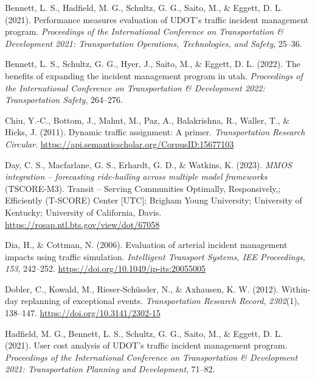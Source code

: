 \documentclass[fancy, oneside, mastersfancy, ms]{byuthesis}
\newlength{\cslhangindent}
\newlength{\cslentryspacingunit} %
\newenvironment{CSLReferences}[2] %
 {%
  \setlength{\parindent}{0pt}
  \ifodd #1
  \let\oldpar\par
  \def\par{\hangindent=\cslhangindent\oldpar}
  \fi
  \setlength{\parskip}{#2\cslentryspacingunit}
 }%
 {}
\begin{document}
\hypertarget{refs}{}
\begin{CSLReferences}{1}{0}
\leavevmode{}%
Bennett, L. S., Hadfield, M. G., Schultz, G. G., Saito, M., \& Eggett,
D. L. (2021). Performance measures evaluation of UDOT's traffic incident
management program. \emph{Proceedings of the International Conference on
Transportation \& Development 2021: Transportation Operations,
Technologies, and Safety}, 25--36.

\leavevmode{}%
Bennett, L. S., Schultz, G. G., Hyer, J., Saito, M., \& Eggett, D. L.
(2022). The benefits of expanding the incident management program in
utah. \emph{Proceedings of the International Conference on
Transportation \& Development 2022: Transportation Safety}, 264--276.

\leavevmode{}%
Chiu, Y.-C., Bottom, J., Mahut, M., Paz, A., Balakrishna, R., Waller,
T., \& Hicks, J. (2011). Dynamic traffic assignment: A primer.
\emph{Transportation Research Circular}.
\url{https://api.semanticscholar.org/CorpusID:15677103}

\leavevmode{}%
Day, C. S., Macfarlane, G. S., Erhardt, G. D., \& Watkins, K. (2023).
\emph{MMOS integration -- forecasting ride-hailing across multiple model
frameworks} (TSCORE-M3). Transit -- Serving Communities Optimally,
Responsively,; Efficiently (T-SCORE) Center {[}UTC{]}; Brigham Young
University; University of Kentucky; University of California, Davis.
\url{https://rosap.ntl.bts.gov/view/dot/67058}

\leavevmode{}%
Dia, H., \& Cottman, N. (2006). Evaluation of arterial incident
management impacts using traffic simulation. \emph{Intelligent Transport
Systems, IEE Proceedings}, \emph{153}, 242--252.
\url{https://doi.org/10.1049/ip-its:20055005}

\leavevmode{}%
Dobler, C., Kowald, M., Rieser-Schüssler, N., \& Axhausen, K. W. (2012).
Within-day replanning of exceptional events. \emph{Transportation
Research Record}, \emph{2302}(1), 138--147.
\url{https://doi.org/10.3141/2302-15}

\leavevmode{}%
Hadfield, M. G., Bennett, L. S., Schultz, G. G., Saito, M., \& Eggett,
D. L. (2021). User cost analysis of UDOT's traffic incident management
program. \emph{Proceedings of the International Conference on
Transportation \& Development 2021: Transportation Planning and
Development}, 71--82.


\end{CSLReferences}
\end{document}
